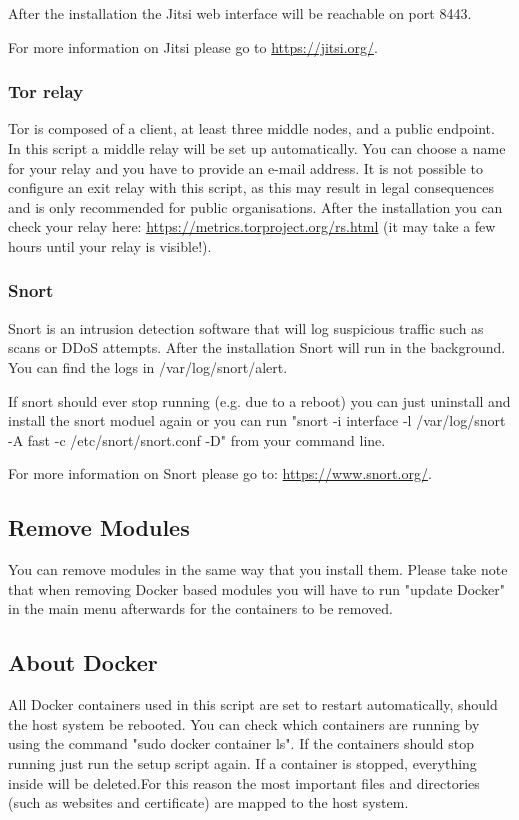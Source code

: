 \documentclass[a4paper,10pt]{scrartcl}
\begin{document}
\noindent After the installation the Jitsi web interface will be reachable on port 8443. \newline

\noindent For more information on Jitsi please go to \url{https://jitsi.org/}.

\subsubsection{Tor relay}

Tor is composed of a client, at least three middle nodes, and a public endpoint. In this script a middle relay will be set up automatically. You can choose a name for your relay and you have to provide an e-mail address. It is not possible to configure an exit relay with this script, as this may result in legal consequences and is only recommended for public organisations. After the installation you can check your relay here: \url{https://metrics.torproject.org/rs.html} (it may take a few hours until your relay is visible!).

\subsubsection{Snort}

Snort is an intrusion detection software that will log suspicious traffic such as scans or DDoS attempts. After the installation Snort will run in the background. You can find the logs in /var/log/snort/alert.

\noindent If snort should ever stop running (e.g. due to a reboot) you can just uninstall and install the snort moduel again or you can run "snort -i interface -l /var/log/snort -A fast -c /etc/snort/snort.conf -D" from your command line. \newline

\noindent For more information on Snort please go to: \url{https://www.snort.org/}.

\subsection{Remove Modules}

You can remove modules in the same way that you install them. Please take note that when removing Docker based modules you will have to run "update Docker" in the main menu afterwards for the containers to be removed.

\subsection{About Docker}

All Docker containers used in this script are set to restart automatically, should the host system be rebooted. You can check which containers are running by using the command "sudo docker container ls". If the containers should stop running just run the setup script again. If a container is stopped, everything inside will be deleted.For this reason the most important files and directories (such as websites and certificate) are mapped to the host system.
\end{document}

